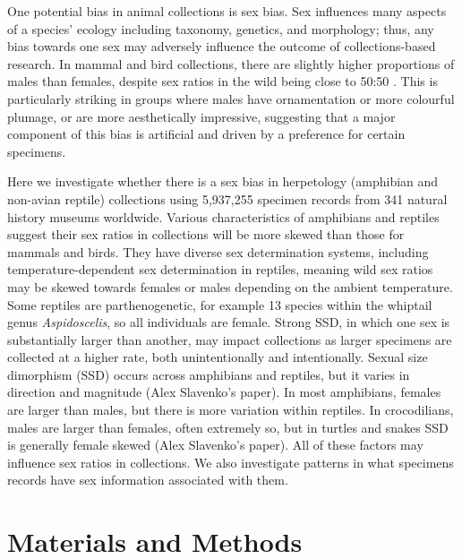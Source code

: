\documentclass[a4paper, 12pt]{article}
\begin{document}
One potential bias in animal collections is sex bias. 
Sex influences many aspects of a species’ ecology including taxonomy, genetics, and morphology; thus, any bias towards one sex may adversely influence the outcome of collections-based research\cite{cooper2019sex}. 
In mammal and bird collections, there are slightly higher proportions of males than females\cite{machin2008,cooper2019sex,gower2019}, despite sex ratios in the wild being close to 50:50 \cite{karlin1986theoretical,szekely2014sex}. 
This is particularly striking in groups where males have  ornamentation or more colourful plumage, or are more aesthetically impressive\cite{pyke2010biological,cooper2019sex}, suggesting that a major component of this bias is artificial and driven by a preference for certain specimens. 

Here we investigate whether there is a sex bias in herpetology (amphibian and non-avian reptile) collections using 5,937,255 specimen records from 341 natural history museums worldwide\cite{gbif-amphibians,gbif-reptiles}. 
Various characteristics of amphibians and reptiles suggest their sex ratios in collections will be more skewed than those for mammals and birds. 
They have diverse sex determination systems\cite{miura2017sex,katona2021evolutionary}, including temperature-dependent sex determination in reptiles, meaning wild sex ratios may be skewed towards females or males depending on the ambient temperature\cite{while2018patterns}. 
Some reptiles are parthenogenetic, for example 13 species within the whiptail genus \textit{Aspidoscelis}\cite{barley2019complex}, so all individuals are female. 
Strong SSD, in which one sex is substantially larger than another, may impact collections as larger specimens are collected at a higher rate, both unintentionally and intentionally\cite{cooper2019sex,gower2019,thompson2020avian}.
Sexual size dimorphism (SSD) occurs across amphibians and reptiles, but it varies in direction and magnitude (Alex Slavenko’s paper). 
In most amphibians, females are larger than males\cite{pincheira2021multiple}, but there is more variation within reptiles. 
In crocodilians, males are larger than females, often extremely so, but in turtles and snakes SSD is generally female skewed (Alex Slavenko’s paper). 
All of these factors may influence sex ratios in collections. 
We also investigate patterns in what specimens records have sex information associated with them. 

\section{Materials and Methods}
\end{document}
